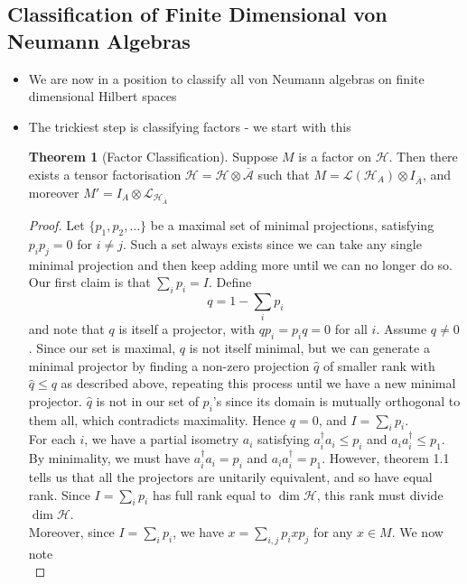 \documentclass[12pt,a4paper]{article}
\numberwithin{equation}{section}
\theoremstyle{definition}
\theoremstyle{theorem}
\newtheorem{theorem}{Theorem}[section]
\begin{document}
	\subsection{Classification of Finite Dimensional von Neumann Algebras}
	\begin{itemize}
		\item We are now in a position to classify all von Neumann algebras on finite dimensional Hilbert spaces
		\item The trickiest step is classifying factors - we start with this
		\begin{theorem}[Factor Classification]
			Suppose $M$ is a factor on $\mathcal{H}$. Then there exists a tensor factorisation $\mathcal{H}=\mathcal{H}\otimes\mathcal{\overline{A}}$ such that $M=\mathcal{L}(\mathcal{H}_{A})\otimes I_{\overline{A}}$, and moreover $M'=I_{A}\otimes\mathcal{L}_{\mathcal{H}_{\overline{A}}}$
		\end{theorem}
		\begin{proof}
			Let $\{p_{1},p_{2},\ldots\}$ be a maximal set of minimal projections, satisfying $p_{i}p_{j}=0$ for $i\neq j$. Such a set always exists since we can take any single minimal projection and then keep adding more until we can no longer do so. Our first claim is that $\sum_{i}p_{i}=I$. Define
			\begin{equation}
				q=1-\sum_{i}p_{i}
			\end{equation}
			and note that $q$ is itself a projector, with $qp_{i}=p_{i}q=0$ for all $i$. Assume $q\neq 0$. Since our set is maximal, $q$ is not itself minimal, but we can generate a minimal projector by finding a non-zero projection $\hat{q}$ of smaller rank with $\hat{q}\leq q$ as described above, repeating this process until we have a new minimal projector. $\hat{q}$ is not in our set of $p_{i}$'s since its domain is mutually orthogonal to them all, which contradicts maximality. Hence $q=0$, and $I=\sum_{i}p_{i}$.\\
			For each $i$, we have a partial isometry $a_{i}$ satisfying $a_{i}^{\dagger}a_{i}\leq p_{i}$ and $a_{i}a_{i}^{\dagger}\leq p_{1}$. By minimality, we must have $a_{i}^{\dagger}a_{i}=p_{i}$ and $a_{i}a_{i}^{\dagger}=p_{1}$. However, theorem 1.1 tells us that all the projectors are unitarily equivalent, and so have equal rank. Since $I=\sum_{i}p_{i}$ has full rank equal to $\dim{\mathcal{H}}$, this rank must divide $\dim{\mathcal{H}}$.\\
			Moreover, since $I=\sum_{i}p_{i}$, we have $x=\sum_{i,j}p_{i}xp_{j}$ for any $x\in M$. We now note 
			\begin{equation}

\end{equation}
\end{proof}
\end{itemize}
\end{document}
